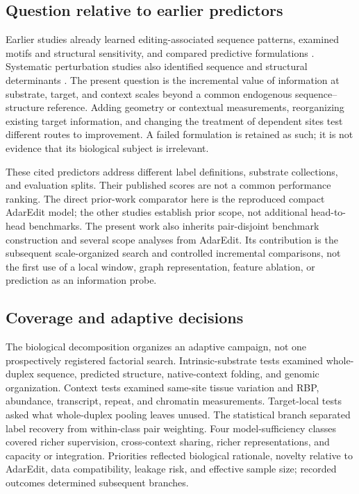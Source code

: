 \documentclass[9pt,twoside]{pnas-new}
\begin{document}
\subsection*{Question relative to earlier predictors}

Earlier studies already learned editing-associated sequence patterns, examined motifs and structural sensitivity, and compared predictive formulations \cite{Eggington2011,Ouyang2018DeepRed,Wang2021EditPredict,Rosenwasser2026AdarGPT,Rosenwasser2026AdarEdit}. Systematic perturbation studies also identified sequence and structural determinants \cite{Uzonyi2021,ZambranoMila2023}. The present question is the incremental value of information at substrate, target, and context scales beyond a common endogenous sequence--structure reference. Adding geometry or contextual measurements, reorganizing existing target information, and changing the treatment of dependent sites test different routes to improvement. A failed formulation is retained as such; it is not evidence that its biological subject is irrelevant.

These cited predictors address different label definitions, substrate collections, and evaluation splits. Their published scores are not a common performance ranking. The direct prior-work comparator here is the reproduced compact AdarEdit model; the other studies establish prior scope, not additional head-to-head benchmarks. The present work also inherits pair-disjoint benchmark construction and several scope analyses from AdarEdit. Its contribution is the subsequent scale-organized search and controlled incremental comparisons, not the first use of a local window, graph representation, feature ablation, or prediction as an information probe.

\subsection*{Coverage and adaptive decisions}

The biological decomposition organizes an adaptive campaign, not one prospectively registered factorial search. Intrinsic-substrate tests examined whole-duplex sequence, predicted structure, native-context folding, and genomic organization. Context tests examined same-site tissue variation and RBP, abundance, transcript, repeat, and chromatin measurements. Target-local tests asked what whole-duplex pooling leaves unused. The statistical branch separated label recovery from within-class pair weighting. Four model-sufficiency classes covered richer supervision, cross-context sharing, richer representations, and capacity or integration. Priorities reflected biological rationale, novelty relative to AdarEdit, data compatibility, leakage risk, and effective sample size; recorded outcomes determined subsequent branches.
\end{document}
